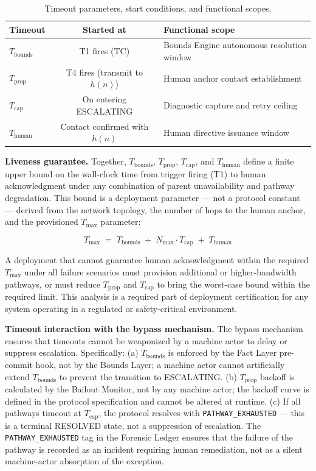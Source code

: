 \begin{table}[htbp]
\centering
\caption{Timeout parameters, start conditions, and functional scopes.}
\label{tab:bailout-timeouts}
\begin{tabular}{@{}lcl@{}}
\toprule
\textbf{Timeout} & \textbf{Started at} & \textbf{Functional scope} \\
\midrule
$T_{\text{bounds}}$ & T1 fires (TC) & Bounds Engine autonomous resolution window \\
$T_{\text{prop}}$ & T4 fires (transmit to $h(n)$) & Human anchor contact establishment \\
$T_{\text{cap}}$ & On entering ESCALATING & Diagnostic capture and retry ceiling \\
$T_{\text{human}}$ & Contact confirmed with $h(n)$ & Human directive issuance window \\
\bottomrule
\end{tabular}
\end{table}

\bigskip
\noindent\textbf{Liveness guarantee.} Together, $T_{\text{bounds}}$, $T_{\text{prop}}$, $T_{\text{cap}}$, and $T_{\text{human}}$ define a finite upper bound on the wall-clock time from trigger firing (T1) to human acknowledgment under any combination of parent unavailability and pathway degradation. This bound is a deployment parameter --- not a protocol constant --- derived from the network topology, the number of hops to the human anchor, and the provisioned $T_{\max}$ parameter:

\begin{equation}
T_{\max} \;=\; T_{\text{bounds}} \;+\; N_{\max} \cdot T_{\text{cap}} \;+\; T_{\text{human}} \tag{T-max}
\end{equation}

A deployment that cannot guarantee human acknowledgment within the required $T_{\max}$ under all failure scenarios must provision additional or higher-bandwidth pathways, or must reduce $T_{\text{prop}}$ and $T_{\text{cap}}$ to bring the worst-case bound within the required limit. This analysis is a required part of deployment certification for any \bxthree{} system operating in a regulated or safety-critical environment.

\bigskip
\noindent\textbf{Timeout interaction with the bypass mechanism.} The bypass mechanism ensures that timeouts cannot be weaponized by a machine actor to delay or suppress escalation. Specifically: (a) $T_{\text{bounds}}$ is enforced by the Fact Layer pre-commit hook, not by the Bounds Layer; a machine actor cannot artificially extend $T_{\text{bounds}}$ to prevent the transition to ESCALATING. (b) $T_{\text{prop}}$ backoff is calculated by the Bailout Monitor, not by any machine actor; the backoff curve is defined in the protocol specification and cannot be altered at runtime. (c) If all pathways timeout at $T_{\text{cap}}$, the protocol resolves with \texttt{PATHWAY\_EXHAUSTED} --- this is a terminal RESOLVED state, not a suppression of escalation. The \texttt{PATHWAY\_EXHAUSTED} tag in the Forensic Ledger ensures that the failure of the pathway is recorded as an incident requiring human remediation, not as a silent machine-actor absorption of the exception.